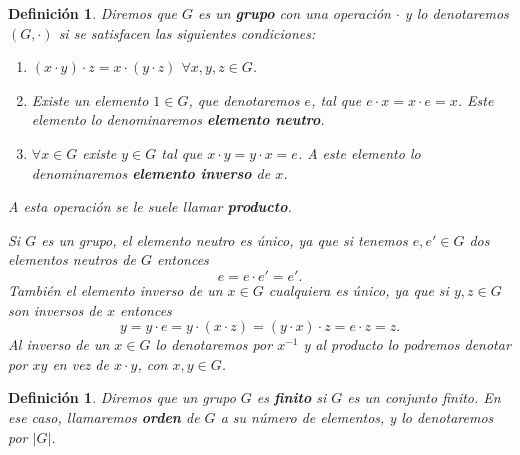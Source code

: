 \documentclass[12pt]{article}
\newtheorem{definition}[theorem]{Definición}
\begin{document}
\begin{definition}Diremos que $G$ es un \textbf{grupo} con una operación $\cdot$ y lo denotaremos $(G,\cdot)$ si se satisfacen las siguientes condiciones:
\begin{enumerate}
\renewcommand{\theenumi}{\roman{enumi}} %
\item $(x\cdot y)\cdot z = x\cdot(y\cdot z)$ $\forall x,y,z \in G$. 
\item Existe un elemento $1 \in G$, que denotaremos $e$, tal que $e\cdot x = x \cdot e = x$. Este elemento lo denominaremos \textbf{elemento neutro}.
\item $\forall x \in G$ existe $y \in G$ tal que $x\cdot y = y \cdot x = e$. A este elemento lo denominaremos \textbf{elemento inverso} de $x$.
\end{enumerate}

A esta operación se le suele llamar \textbf{producto}.

Si $G$ es un grupo, el elemento neutro es único, ya que si tenemos $e,e'\in G$ dos elementos neutros de $G$ entonces $$e=e\cdot e' = e'.$$
También el elemento inverso de un $x\in G$ cualquiera es único, ya que si $y,z \in G$ son inversos de $x$ entonces $$y = y \cdot e = y \cdot (x \cdot z) = (y \cdot x) \cdot z = e \cdot z = z.$$
Al inverso de un $x \in G$ lo denotaremos por $x^{-1}$ y al producto lo podremos denotar por $xy$ en vez de $x \cdot y$, con $x,y \in G$.
\end{definition}

\begin{definition}Diremos que un grupo $G$ es \textbf{finito} si $G$ es un conjunto finito. En ese caso, llamaremos \textbf{orden} de $G$ a su número de elementos, y lo denotaremos por $|G|$.
\end{definition}
\end{document}
